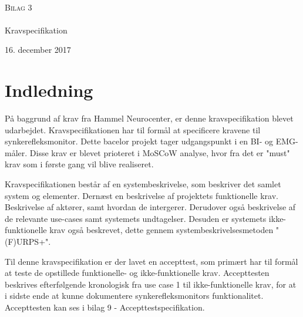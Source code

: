 \documentclass[main.tex]{subfiles}
\begin{document}
\begin{titlingpage}
\begin{center}

~ \\[3cm]


\textsc{\LARGE Bilag 3}\\[1.5cm]


\noindent\makebox[\linewidth]{\rule{\textwidth}{0.4pt}}\\
[0.5cm]{\Huge Kravspecifikation}
\noindent\makebox[\linewidth]{\rule{\textwidth}{0.4pt}}
\end{center}
\vfill
\begin{center}
{\large 16. december 2017}
\end{center}
\end{titlingpage}

\newpage
\tableofcontents*


\chapter{Indledning}
På baggrund af krav fra Hammel Neurocenter, er denne
kravspecifikation blevet udarbejdet. Kravspecifikationen har til formål at specificere
kravene til synkerefleksmonitor. Dette bacelor projekt tager udgangspunkt i en BI- og EMG-måler. Disse krav er blevet prioteret i MoSCoW analyse, hvor fra det er "must" krav som i første gang vil blive realiseret. 

Kravspecifikationen består af en systembeskrivelse, som beskriver det samlet system og elementer. Dernæst en beskrivelse af projektets funktionelle krav. Beskrivelse af
aktører, samt hvordan de intergerer. Derudover også beskrivelse af de relevante use-cases
samt systemets undtagelser. Desuden er systemets ikke-funktionelle krav også beskrevet,
dette gennem systembeskrivelsesmetoden "(F)URPS+".

Til denne kravspecifikation er der lavet en accepttest, som primært har til formål at teste
de opstillede funktionelle- og ikke-funktionelle krav. Accepttesten beskrives efterfølgende
kronologisk fra use case 1 til ikke-funktionelle krav, for at i sidste ende at kunne
dokumentere synkerefleksmonitors funktionalitet. Accepttesten kan ses i bilag 9 - Accepttestspecifikation.
\end{document}
